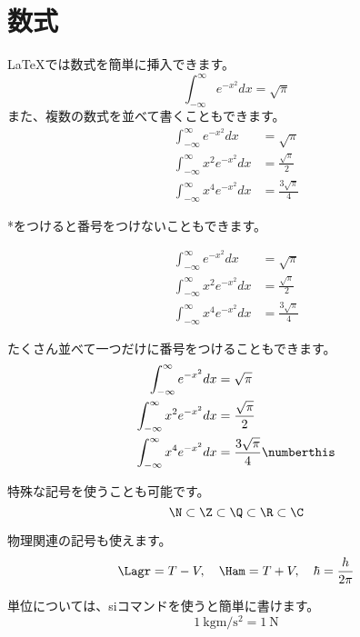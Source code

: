 \chapter{数式}
\LaTeX では数式を簡単に挿入できます。
\begin{equation}
    \int_{-\infty}^{\infty} e^{-x^2} dx = \sqrt{\pi}
    \label{eq:gaussian}
\end{equation}
また、複数の数式を並べて書くこともできます。
\begin{align}
    \int_{-\infty}^{\infty} e^{-x^2} dx    & = \sqrt{\pi}            \\
    \int_{-\infty}^{\infty}x^2 e^{-x^2} dx & = \frac{\sqrt{\pi}}{2}  \\
    \int_{-\infty}^{\infty}x^4 e^{-x^2} dx & = \frac{3\sqrt{\pi}}{4}
\end{align}

*をつけると番号をつけないこともできます。

\begin{align*}
    \int_{-\infty}^{\infty} e^{-x^2} dx    & = \sqrt{\pi}            \\
    \int_{-\infty}^{\infty}x^2 e^{-x^2} dx & = \frac{\sqrt{\pi}}{2}  \\
    \int_{-\infty}^{\infty}x^4 e^{-x^2} dx & = \frac{3\sqrt{\pi}}{4}
\end{align*}

たくさん並べて一つだけに番号をつけることもできます。
\begin{align*}
    \int_{-\infty}^{\infty} e^{-x^2} dx    & = \sqrt{\pi}                                              \\
    \int_{-\infty}^{\infty}x^2 e^{-x^2} dx & = \frac{\sqrt{\pi}}{2}                                    \\
    \int_{-\infty}^{\infty}x^4 e^{-x^2} dx & = \frac{3\sqrt{\pi}}{4} \numberthis \label{eq:gaussian_4}
\end{align*}

特殊な記号を使うことも可能です。
\begin{equation}
    \N \subset \Z \subset \Q \subset \R \subset \C
\end{equation}

物理関連の記号も使えます。
\begin{equation}
    \Lagr = T - V, \quad \Ham = T + V, \quad\hbar = \frac{h}{2\pi}
\end{equation}

単位については、siコマンドを使うと簡単に書けます。
\begin{equation}
    \SI{1}{\kilogram\meter\per\second\squared} = \SI{1}{\newton}
\end{equation}

